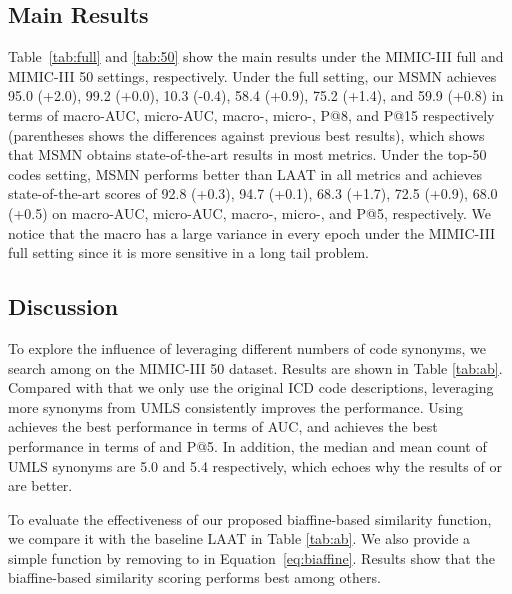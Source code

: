 \documentclass[11pt]{article}
\begin{document}
\subsection{Main Results}



Table~\ref{tab:full} and \ref{tab:50} show the main results under the MIMIC-III full and MIMIC-III 50 settings, respectively. 
Under the full setting, our MSMN achieves 95.0 (+2.0), 99.2 (+0.0), 10.3 (-0.4), 58.4 (+0.9), 75.2 (+1.4), and 59.9 (+0.8) in terms of macro-AUC, micro-AUC, macro-, micro-, P@8, and P@15 respectively (parentheses shows the differences against previous best results), which shows that MSMN obtains state-of-the-art results in most metrics.
Under the top-50 codes setting, MSMN performs better than LAAT  in all metrics and achieves state-of-the-art scores of 92.8 (+0.3), 94.7 (+0.1), 68.3 (+1.7), 72.5 (+0.9), 68.0 (+0.5) on macro-AUC, micro-AUC, macro-, micro-, and P@5, respectively. 
We notice that the macro  has a large variance in every epoch under the MIMIC-III full setting since it is more sensitive in a long tail problem.





\subsection{Discussion}



To explore the influence of leveraging different numbers of code synonyms, we search  among  on the MIMIC-III 50 dataset. Results are shown in Table \ref{tab:ab}.
Compared with  that we only use the original ICD code descriptions, leveraging more synonyms from UMLS consistently improves the performance. Using  achieves the best performance in terms of AUC, and  achieves the best performance in terms of  and P@5. In addition, the median and mean count of UMLS synonyms are 5.0 and 5.4 respectively, which echoes why the results of  or  are better.






To evaluate the effectiveness of our proposed biaffine-based similarity function, we compare it with the baseline LAAT in Table \ref{tab:ab}. We also provide a simple function by removing  to  in Equation~\ref{eq:biaffine}. Results show that the biaffine-based similarity scoring performs best among others.
\end{document}
